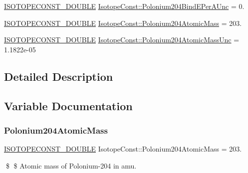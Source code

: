 \begin{DoxyCompactItemize}
\mbox{\hyperlink{group___isotope_const-_macros_ga8f45a7272ce02c0b4c65c44636ed719a}{I\+S\+O\+T\+O\+P\+E\+C\+O\+N\+S\+T\+\_\+\+D\+O\+U\+B\+LE}} \mbox{\hyperlink{group___isotope_const-_polonium-_po204_ga7e6c935514016b9e3f1daba272ffd6e4}{Isotope\+Const\+::\+Polonium204\+Bind\+E\+Per\+A\+Unc}} = 0.
\item 
\mbox{\hyperlink{group___isotope_const-_macros_ga8f45a7272ce02c0b4c65c44636ed719a}{I\+S\+O\+T\+O\+P\+E\+C\+O\+N\+S\+T\+\_\+\+D\+O\+U\+B\+LE}} \mbox{\hyperlink{group___isotope_const-_polonium-_po204_ga01cf0e8152774427f368b38b83393993}{Isotope\+Const\+::\+Polonium204\+Atomic\+Mass}} = 203.
\item 
\mbox{\hyperlink{group___isotope_const-_macros_ga8f45a7272ce02c0b4c65c44636ed719a}{I\+S\+O\+T\+O\+P\+E\+C\+O\+N\+S\+T\+\_\+\+D\+O\+U\+B\+LE}} \mbox{\hyperlink{group___isotope_const-_polonium-_po204_gaf4b748028eee1f238cd01aa3fd8c165e}{Isotope\+Const\+::\+Polonium204\+Atomic\+Mass\+Unc}} = 1.\+1822e-\/05
\end{DoxyCompactItemize}


\subsection{Detailed Description}


\subsection{Variable Documentation}
\mbox{\label{group___isotope_const-_polonium-_po204_ga01cf0e8152774427f368b38b83393993}} 
\subsubsection{\texorpdfstring{Polonium204\+Atomic\+Mass}{Polonium204AtomicMass}}
{\footnotesize\ttfamily \mbox{\hyperlink{group___isotope_const-_macros_ga8f45a7272ce02c0b4c65c44636ed719a}{I\+S\+O\+T\+O\+P\+E\+C\+O\+N\+S\+T\+\_\+\+D\+O\+U\+B\+LE}} Isotope\+Const\+::\+Polonium204\+Atomic\+Mass = 203.}

\$ \$ Atomic mass of Polonium-\/204 in amu. \mbox{\label{group___isotope_const-_polonium-_po204_gaf4b748028eee1f238cd01aa3fd8c165e}} 
